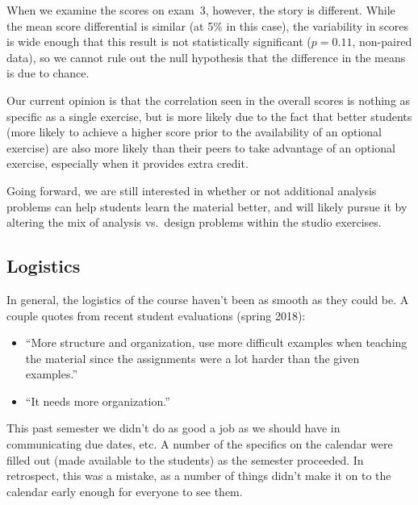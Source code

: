When we examine the scores on exam~3, however, the story is different. While the mean score differential is similar (at 5\% in this case), the variability in scores is wide enough that this result is not statistically significant ($p = 0.11$, non-paired data), so we cannot rule out the null hypothesis that the difference in the means is due to chance.

Our current opinion is that the correlation seen in the overall scores is nothing as specific as a single exercise, but is more likely due to the fact that better students (more likely to achieve a higher score prior to the availability of an optional exercise) are also more likely than their peers to take advantage of an optional exercise, especially when it provides extra credit.


Going forward, we are still interested in whether or not additional analysis problems can help students learn the material better, and will likely pursue it by altering the mix of analysis vs.~design problems within the studio exercises.

\subsection{Logistics}


In general, the logistics of the course haven't been as smooth as they could be. A couple quotes from recent student evaluations (spring 2018):
\begin{itemize}
\item ``More structure and organization, use more difficult examples when teaching the material since the assignments were a lot harder than the given examples.''
\item ``It needs more organization.''
\end{itemize}

This past semester we didn't do as good a job as we should have in communicating due dates, etc. A number of the specifics on the calendar were filled out (made available to the students) as the semester proceeded. In retrospect, this was a mistake, as a number of things didn't make it on to the calendar early enough for everyone to see them.

